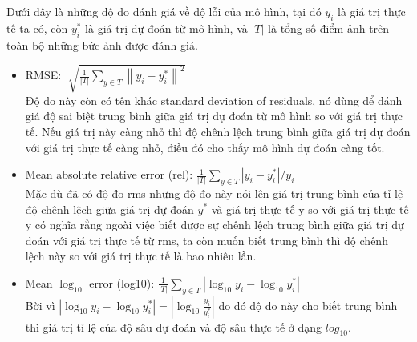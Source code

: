 Dưới đây là những độ đo đánh giá về độ lỗi của mô hình, tại đó $y_i$ là giá trị thực tế ta có, còn $y_i^{*}$ là giá trị dự đoán từ mô hình, và $\left | T \right |$ là tổng số điểm ảnh trên toàn bộ những bức ảnh được đánh giá.
\begin{itemize}
\item RMSE: $\sqrt[]{\frac{1}{\left | T \right |} \sum _{y\in T}\left \|y_{i}-y_{i}^{*}  \right \|^{2}}$\\
Độ đo này còn có tên khác standard deviation of residuals, nó dùng để đánh giá độ sai biệt trung bình giữa giá trị dự đoán từ mô hình so với giá trị thực tế. Nếu giá trị này càng nhỏ thì độ chênh lệch trung bình giữa giá trị dự đoán với giá trị thực tế càng nhỏ, điều đó cho thấy mô hình dự đoán càng tốt.

\item Mean absolute relative error (rel): $\frac{1}{\left | T \right |} \sum _{y\in T} \left | y_i - y_i^{*} \right |/y_i$\\
Mặc dù đã có độ đo rms nhưng độ đo này nói lên giá trị trung bình của tỉ lệ độ chênh lệch giữa giá trị dự đoán $y^{*}$ và giá trị thực tế y so với giá trị thực tế y có nghĩa rằng ngoài việc biết được sự chênh lệch trung bình giữa giá trị dự đoán với giá trị thực tế  từ rms, ta còn muốn biết trung bình thì độ chênh lệch này so với giá trị thực tế là bao nhiêu lần.

\item Mean $\log_{10}$ error (log10): $\frac{1}{\left | T \right |} \sum _{y\in T}\left | \log_{10}y_i- \log_{10}y_i^{*}  \right |$\\
 Bời vì $\left | \log_{10}y_i- \log_{10}y_i^{*}  \right | = \left | \log_{10}\frac{y_i}{y_i^{*}}  \right |$ do đó độ đo này cho biết trung bình thì giá trị tỉ lệ của độ sâu dự đoán và độ sâu thực tế ở dạng $log_{10}$.
\end{itemize}

